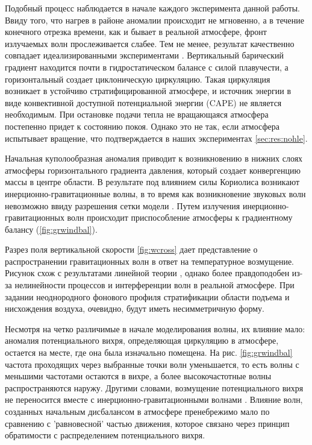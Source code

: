 \documentclass[12pt,a4paper]{report}
\begin{document}
Подобный процесс наблюдается в начале каждого эксперимента данной работы. Ввиду того, что нагрев в районе аномалии происходит не мгновенно, а в течение конечного отрезка времени, как и бывает в реальной атмосфере,  фронт излучаемых волн прослеживается слабее. Тем не менее, результат качественно совпадает идеализированными экспериментами \citep{RT2003}. Вертикальный барический градиент находится почти в гидростатическом балансе с силой плавучести, а горизонтальный создает циклоническую циркуляцию. Такая циркуляция возникает в устойчиво стратифицированной атмосфере, и источник энергии в виде конвективной доступной потенциальной энергии (CAPE) не является необходимым. При остановке подачи тепла не вращающаяся атмосфера постепенно придет к состоянию покоя. Однако это не так, если атмосфера испытывает вращение, что подтверждается в наших экспериментах \ref{sec:res:nohle}.

Начальная куполообразная аномалия приводит к возникновению в нижних слоях атмосферы горизонтального градиента давления, который создает конвергенцию массы в центре области. В результате под влиянием силы Кориолиса возникают инерционно-гравитационные волны, в то время как возникновение звуковых волн невозможно ввиду разрешения сетки модели \citep{MillerWhite1984,MirandaPhD}. Путем излучения инерционно-гравитационных волн происходит приспособление атмосферы к градиентному балансу (\ref{fig:grwindbal}).

\begin{wrapfigure}{L}{0.5\textwidth}
\begin{center}
\texttt{[image: \{./chapters/figures\_results/ctrl\_grwindbal2p]}.jpg}
\end{center}
\caption{Вертикальный разрез вертикальной скорости $w$. Эксперимент CTRL. ??? час модельного времени.}
\label{fig:wcross}
\end{wrapfigure} 

Разрез поля вертикальной скорости \ref{fig:wcross} дает представление о распространении гравитационных волн в ответ на температурное возмущение. Рисунок схож с результатами линейной теории \citep{Lin2007}, однако более правдоподобен из-за нелинейности процессов и интерференции волн в реальной атмосфере. При задании неоднородного фонового профиля стратификации области подъема и нисхождения воздуха, очевидно, будут иметь несимметричную форму.

Несмотря на четко различимые в начале моделирования волны, их влияние мало: аномалия потенциального вихря, определяющая циркуляцию в атмосфере, остается на месте, где она была изначально помещена. На рис. \ref{fig:grwindbal} частота проходящих через выбранные точки волн уменьшается, то есть волны с меньшими частотами остаются в вихре, а более высокочастотные волны распространяются наружу. Другими словами, возмущение потенциального вихря не переносится вместе с инерционно-гравитационными волнами \citep{RT2003}. Влияние волн, созданных начальным дисбалансом в атмосфере пренебрежимо мало по сравнению с 'равновесной' частью движения, которое связано через принцип обратимости с распределением потенциального вихря.
\end{document}
